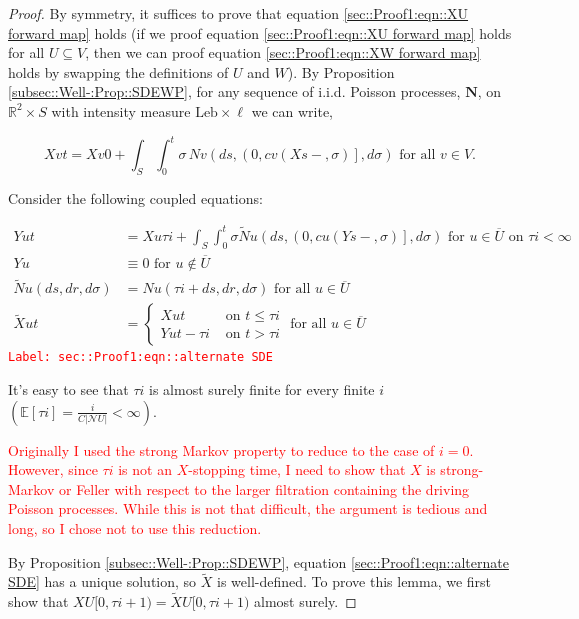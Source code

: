 \documentclass[12pt]{article}
\newcommand{\mb}{\mathbb}
\newcommand{\mc}{\mathcal}
\newcommand{\ov}{\overline}
\newcommand{\te}{\text}
\newcommand{\tr}{\textcolor{red}}
\newcommand{\labe}[1]{\tr{\texttt{Label: #1}}}
\newcommand{\ind}{\hspace{24pt}}
\newcommand{\ex}[1]{\mb{E}\left[#1\right]}			%
\renewcommand{\v}{v}							%
\newcommand{\vv}{u}								%
\renewcommand{\U}{U}							%
\newcommand{\UU}{W}								%
\renewcommand{\S}{S}							%
\newcommand{\s}{\sigma}							%
\renewcommand{\t}{t}							%
\renewcommand{\tt}{s}							%
\newcommand{\X}{X}								%
\newcommand{\IGr}{c}							%
\newcommand{\neigh}{\mc{N}}						%
\newcommand{\cl}{\ov}							%
\newcommand{\const}{C}							%
\newcommand{\poisses}{\mathbf{N}}				%
\newcommand{\poiss}{N}							%
\newcommand{\leb}{\te{Leb}}						%
\newcommand{\Sm}{\ell}							%
\renewcommand{\r}{r}							%
\newcommand{\alt}[1]{\widetilde{#1}}			%
\newcommand{\XX}{Y}								%
\newcommand{\rt}{\tau}							%
\begin{document}
\begin{proof}
By symmetry, it suffices to prove that equation \ref{sec::Proof1:eqn::XU forward map} holds (if we proof equation \eqref{sec::Proof1:eqn::XU forward map} holds for all \(\U \subseteq  V\), then we can proof equation \eqref{sec::Proof1:eqn::XW forward map} holds by swapping the definitions of \(\U\) and \(\UU\)). By Proposition \ref{subsec::Well-:Prop::SDEWP}, for any sequence of i.i.d. Poisson processes, \(\poisses\), on \(\mb{R}^2\times \S\) with intensity measure \(\leb\times\Sm\) we can write,

\[\X{\v}{\t} = \X{\v}{0} + \int_\S\int_0^\t \s\,\poiss{\v}\left(d\tt,\left(0,\IGr{\v}(\X{}{\tt-},\s)\right],d\s\right)\te{ for all } \v\in  V.\]

Consider the following coupled equations:

\begin{align}
\XX{\vv}{\t} &= \X{\vv}{\rt{i}} + \int_\S\int_0^\t \s\alt{\poiss}{\vv}\left(d\tt,\left(0,\IGr{\vv}(\XX{}{\tt-},\s)\right],d\s\right)\te{ for } \vv \in \cl{\U} \te{ on } \rt{i} < \infty \label{sec::Proof1:eqn::alternate SDE}\\
\XX{\vv}{} &\equiv 0\te{ for } \vv\notin \cl{\U}\nonumber\\
\alt{\poiss}{\vv}(d\tt,d\r,d\s) &= \poiss{\vv}(\rt{i} + d\tt,d\r,d\s) \te{ for all }\vv\in \cl{\U}\nonumber\\
\alt{\X}{{\vv}{\t}} &= \begin{cases}
\X{\vv}{\t} &\te{ on } \t \leq \rt{i}\\
\XX{\vv}{\t - \rt{i}} &\te{ on } \t > \rt{i}
\end{cases} \te{ for all } \vv\in \cl{\U} \nonumber
\end{align}
\labe{sec::Proof1:eqn::alternate SDE}

It's easy to see that \(\rt{i}\) is almost surely finite for every finite \(i\) \(\left(\ex{\rt{i}} = \frac{i}{\const{}|\neigh{\U}|} < \infty\right)\). 

\ind \tr{Originally I used the strong Markov property to reduce to the case of \(i = 0\). However, since \(\rt{i}\) is not an \(\X{}{}\)-stopping time, I need to show that \(\X{}{}\) is strong-Markov or Feller with respect to the larger filtration containing the driving Poisson processes. While this is not that difficult, the argument is tedious and long, so I chose not to use this reduction.}

\ind By Proposition \ref{subsec::Well-:Prop::SDEWP}, equation \eqref{sec::Proof1:eqn::alternate SDE} has a unique solution, so \(\alt{\X}{{}{}}\) is well-defined. To prove this lemma, we first show that \(\X{\U}{[0,\rt{i+1})} = \alt{\X}{{\U}{}}{[0,\rt{i+1})}\) almost surely. 


\end{proof}
\end{document}
